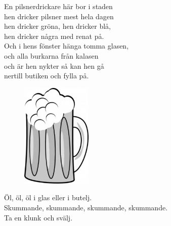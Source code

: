 \documentclass[a6paper,10pt]{article}
\begin{document}
\setlength{\oddsidemargin}{-0.37in}
\begin{center}
\end{center}
\begin{lyrics}
En pilsnerdrickare här bor i staden\\
hen dricker pilsner mest hela dagen\\
hen dricker gröna, hen dricker blå,\\
hen dricker några med renat på.\\
Och i hens fönster hänga tomma glasen,\\
och alla burkarna från kalasen\\
och är hen nykter så kan hen gå\\
nertill butiken och fylla på.
\end{lyrics}
\begin{figure}[!h]
\hspace{30pt}\includegraphics[width=0.3\textwidth]{ol.jpg}
\end{figure}
\begin{center}
\end{center}
\begin{lyrics}
Öl, öl, öl i glas eller i butelj.\\
Skummande, skummande, skummande, skummande.\\
Ta en klunk och svälj.
\end{lyrics}
\end{document}
